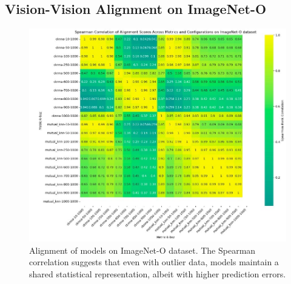 \documentclass[10pt,a4paper]{article}
\begin{document}
\subsection{Vision-Vision Alignment on ImageNet-O}
\begin{figure}[H]
    \centering
    \includegraphics[width=\textwidth]{prh_correlation_ood.jpg}
    \caption{Alignment of models on ImageNet-O dataset. The Spearman correlation suggests that even with outlier data, models maintain a shared statistical representation, albeit with higher prediction errors.}
    \label{fig:prh_correlation_ood}
\end{figure}
\end{document}
